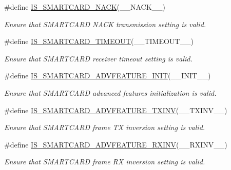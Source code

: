 \begin{DoxyCompactItemize}
\#define \hyperlink{group___s_m_a_r_t_c_a_r_d___private___macros_gac75f6fbce82524fabb8763595068ecdf}{I\+S\+\_\+\+S\+M\+A\+R\+T\+C\+A\+R\+D\+\_\+\+N\+A\+CK}(\+\_\+\+\_\+\+N\+A\+C\+K\+\_\+\+\_\+)
\begin{DoxyCompactList}\small\item\em Ensure that S\+M\+A\+R\+T\+C\+A\+RD N\+A\+CK transmission setting is valid. \end{DoxyCompactList}\item 
\#define \hyperlink{group___s_m_a_r_t_c_a_r_d___private___macros_ga44dd8f160b80c1546c0195387091504b}{I\+S\+\_\+\+S\+M\+A\+R\+T\+C\+A\+R\+D\+\_\+\+T\+I\+M\+E\+O\+UT}(\+\_\+\+\_\+\+T\+I\+M\+E\+O\+U\+T\+\_\+\+\_\+)
\begin{DoxyCompactList}\small\item\em Ensure that S\+M\+A\+R\+T\+C\+A\+RD receiver timeout setting is valid. \end{DoxyCompactList}\item 
\#define \hyperlink{group___s_m_a_r_t_c_a_r_d___private___macros_ga6ecfdd5c1ee1b04c994fc00e1e5e8e1f}{I\+S\+\_\+\+S\+M\+A\+R\+T\+C\+A\+R\+D\+\_\+\+A\+D\+V\+F\+E\+A\+T\+U\+R\+E\+\_\+\+I\+N\+IT}(\+\_\+\+\_\+\+I\+N\+I\+T\+\_\+\+\_\+)
\begin{DoxyCompactList}\small\item\em Ensure that S\+M\+A\+R\+T\+C\+A\+RD advanced features initialization is valid. \end{DoxyCompactList}\item 
\#define \hyperlink{group___s_m_a_r_t_c_a_r_d___private___macros_ga262b4258b744dad01c2452c9f785541a}{I\+S\+\_\+\+S\+M\+A\+R\+T\+C\+A\+R\+D\+\_\+\+A\+D\+V\+F\+E\+A\+T\+U\+R\+E\+\_\+\+T\+X\+I\+NV}(\+\_\+\+\_\+\+T\+X\+I\+N\+V\+\_\+\+\_\+)
\begin{DoxyCompactList}\small\item\em Ensure that S\+M\+A\+R\+T\+C\+A\+RD frame TX inversion setting is valid. \end{DoxyCompactList}\item 
\#define \hyperlink{group___s_m_a_r_t_c_a_r_d___private___macros_gadce13e55560abfa87265b6cc6360a79a}{I\+S\+\_\+\+S\+M\+A\+R\+T\+C\+A\+R\+D\+\_\+\+A\+D\+V\+F\+E\+A\+T\+U\+R\+E\+\_\+\+R\+X\+I\+NV}(\+\_\+\+\_\+\+R\+X\+I\+N\+V\+\_\+\+\_\+)
\begin{DoxyCompactList}\small\item\em Ensure that S\+M\+A\+R\+T\+C\+A\+RD frame RX inversion setting is valid. \end{DoxyCompactList}\item 

\end{DoxyCompactItemize}
